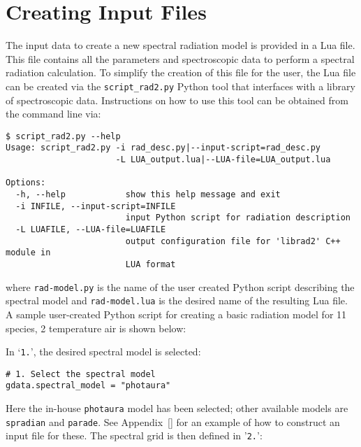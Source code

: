 \chapter{Creating Input Files}
\label{chap:input}

The input data to create a new spectral radiation model is provided in a Lua file.
This file contains all the parameters and spectroscopic data to perform a spectral radiation calculation.
To simplify the creation of this file for the user, the Lua file can be created via the \texttt{script\_rad2.py} Python tool that interfaces with a library of spectroscopic data.
Instructions on how to use this tool can be obtained from the command line via:

\begin{lstlisting}[basicstyle=\ttfamily\small]
$ script_rad2.py --help
Usage: script_rad2.py -i rad_desc.py|--input-script=rad_desc.py
                      -L LUA_output.lua|--LUA-file=LUA_output.lua

Options:
  -h, --help            show this help message and exit
  -i INFILE, --input-script=INFILE
                        input Python script for radiation description
  -L LUAFILE, --LUA-file=LUAFILE
                        output configuration file for 'librad2' C++ module in
                        LUA format
\end{lstlisting}

\noindent where \texttt{rad-model.py} is the name of the user created Python script describing the spectral model and \texttt{rad-model.lua} is the desired name of the resulting Lua file.
A sample user-created Python script for creating a basic radiation model for 11 species, 2 temperature air is shown below:

\noindent \topbar

\bottombar

In `\texttt{1.}', the desired spectral model is selected:

\begin{lstlisting}[basicstyle=\ttfamily\small]
# 1. Select the spectral model
gdata.spectral_model = "photaura"
\end{lstlisting}

Here the in-house \texttt{photaura} model has been selected; other available models are \texttt{spradian} and \texttt{parade}.
See Appendix~\ref{} for an example of how to construct an input file for these.
The spectral grid is then defined in '\texttt{2.}':

